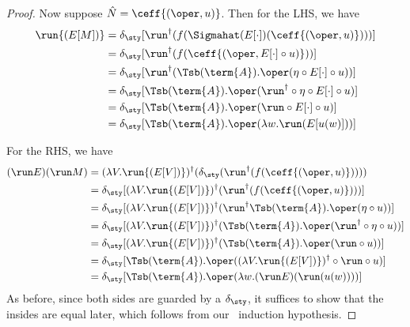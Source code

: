 \begin{proof}
    Now suppose $\hat{N} = \ceff{(\oper, u)}$. Then for the LHS, we have
    \begin{align*}
        \run{(E[M])} 
        &= \delta_{\sty} [\run^{\dag} {(f (\Sigmahat(E[\cdot])(\ceff{(\oper, u)})) )}] \\
        &= \delta_{\sty} [\run^{\dag} {(f (\ceff{(\oper, E[\cdot] \circ u)}) )}] \\
        &= \delta_{\sty} [\run^{\dag} {(\Tsb(\term{A}).\oper(\eta \circ E[\cdot] \circ u) )}] \\
        &= \delta_{\sty} [\Tsb(\term{A}).\oper(\run^{\dag} \circ \eta \circ E[\cdot] \circ u)] \\
        &= \delta_{\sty} [\Tsb(\term{A}).\oper(\run \circ E[\cdot] \circ u)] \\
        &= \delta_{\sty} [\Tsb(\term{A}).\oper(\lambda w. \run (E[u(w)]))] \\
    \end{align*}

    For the RHS, we have
    \begin{align*}
        (\run E)(\run M) 
        &= (\lambda V. \run{(E[V])})^{\dag} (\delta_{\sty} (\run^{\dag} {(f(\ceff{(\oper, u)}))}) ) \\
        &= \delta_{\sty} [(\lambda V. \run{(E[V])})^{\dag} (\run^{\dag} {(f(\ceff{(\oper, u)}))})] \\
        &= \delta_{\sty} [(\lambda V. \run{(E[V])})^{\dag} (\run^{\dag} { \Tsb(\term{A}).\oper(\eta \circ u) })] \\
        &= \delta_{\sty} [(\lambda V. \run{(E[V])})^{\dag} (\Tsb(\term{A}).\oper(\run^{\dag} \circ \eta \circ u))] \\
        &= \delta_{\sty} [(\lambda V. \run{(E[V])})^{\dag} (\Tsb(\term{A}).\oper(\run \circ u))] \\
        &= \delta_{\sty} [\Tsb(\term{A}).\oper((\lambda V. \run{(E[V])})^{\dag} \circ \run \circ u)] \\
        &= \delta_{\sty} [\Tsb(\term{A}).\oper(\lambda w. (\run E) (\run (u(w))))] \\
    \end{align*}
    As before, since both sides are guarded by a $\delta_{\sty}$, it suffices to
    show that the insides are equal later, which follows from our \lob~induction
    hypothesis.



\end{proof}

